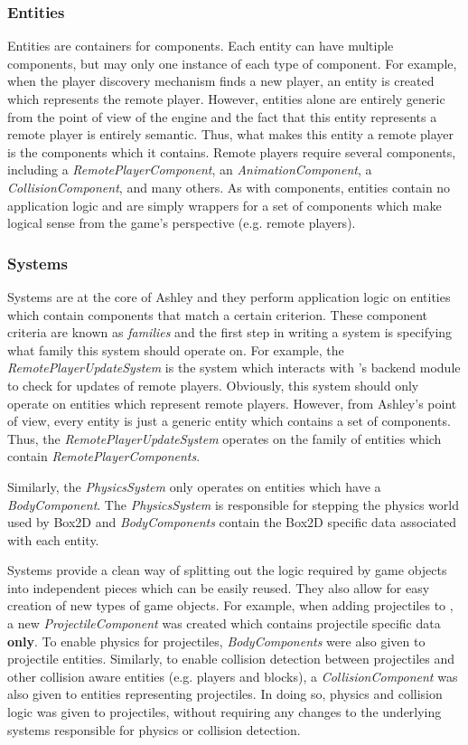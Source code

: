 \subsubsection{Entities}
Entities are containers for components. Each entity can have multiple components, but may only one instance of each type of component. For example, when the player discovery mechanism finds a new player, an entity is created which represents the remote player. However, entities alone are entirely generic from the point of view of the engine and the fact that this entity represents a remote player is entirely semantic. Thus, what makes this entity a remote player is the components which it contains. Remote players require several components, including a \textit{RemotePlayerComponent}, an \textit{AnimationComponent}, a \textit{CollisionComponent}, and many others. As with components, entities contain no application logic and are simply wrappers for a set of components which make logical sense from the game's perspective (e.g. remote players).

\subsubsection{Systems}
Systems are at the core of Ashley and they perform application logic on entities which contain components that match a certain criterion. These component criteria are known as \textit{families} and the first step in writing a system is specifying what family this system should operate on. For example, the \textit{RemotePlayerUpdateSystem} is the system which interacts with \game{}'s backend module to check for updates of remote players. Obviously, this system should only operate on entities which represent remote players. However, from Ashley's point of view, every entity is just a generic entity which contains a set of components. Thus, the \textit{RemotePlayerUpdateSystem} operates on the family of entities which contain \textit{RemotePlayerComponents}. 

Similarly, the \textit{PhysicsSystem} only operates on entities which have a \textit{BodyComponent}. The \textit{PhysicsSystem} is responsible for stepping the physics world used by Box2D and \textit{BodyComponents} contain the Box2D specific data associated with each entity.

Systems provide a clean way of splitting out the logic required by game objects into independent pieces which can be easily reused. They also allow for easy creation of new types of game objects. For example, when adding projectiles to \game{}, a new \textit{ProjectileComponent} was created which contains projectile specific data \textbf{only}. To enable physics for projectiles, \textit{BodyComponents} were also given to projectile entities. Similarly, to enable collision detection between projectiles and other collision aware entities (e.g. players and blocks), a \textit{CollisionComponent} was also given to entities representing projectiles. In doing so, physics and collision logic was given to projectiles, without requiring any changes to the underlying systems responsible for physics or collision detection.


